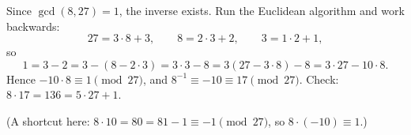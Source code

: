 Since $\gcd(8,27)=1$, the inverse exists. Run the Euclidean algorithm and work backwards:
\[27=3\cdot8+3,\qquad 8=2\cdot3+2,\qquad 3=1\cdot2+1,\]
so
\[1=3-2=3-(8-2\cdot3)=3\cdot3-8=3(27-3\cdot8)-8=3\cdot27-10\cdot8.\]
Hence $-10\cdot8\equiv1\pmod{27}$, and $8^{-1}\equiv-10\equiv\boxed{17}\pmod{27}$. Check: $8\cdot17=136=5\cdot27+1$.

(A shortcut here: $8\cdot10=80=81-1\equiv-1\pmod{27}$, so $8\cdot(-10)\equiv1$.)
